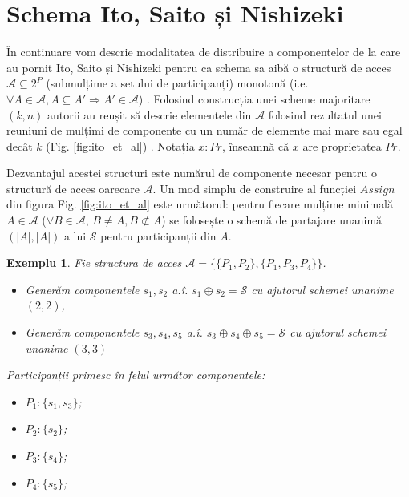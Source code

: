 \documentclass[oneside, 12pt]{book}
\newtheorem{exemplu}{\textbf{Exemplu}}[section]
\begin{document}

\section{Schema Ito, Saito și Nishizeki}
\label{Ito}

În continuare vom descrie modalitatea de distribuire a componentelor de la care au pornit Ito, Saito și Nishizeki pentru ca schema sa aibă o structură de acces $\mathcal{A} \subseteq 2^P$ (submulțime a setului de participanți) monotonă (i.e. $\forall A \in \mathcal{A}, A \subseteq A' \Rightarrow A' \in \mathcal{A}$) \cite{ITO:1989}. 
Folosind construcția unei scheme majoritare $(k, n)$ autorii au reușit să descrie elementele din $\mathcal{A}$ folosind rezultatul unei reuniuni de mulțimi de componente cu un număr de elemente mai mare sau egal decât $k$ (Fig. \ref{fig:ito_et_al}) \cite{ITO:1989}. Notația $x : Pr$, înseamnă că $x$ are proprietatea $Pr$. 

Dezvantajul acestei structuri este numărul de componente necesar pentru o structură de acces oarecare $\mathcal{A}$. Un mod simplu de construire al funcției $Assign$ din figura Fig. \ref{fig:ito_et_al} este următorul: pentru fiecare mulțime minimală $A \in \mathcal{A}$ ($\forall B \in \mathcal{A}$, $B \neq A, B \not\subset A$) se folosește o schemă de partajare unanimă $(|A|, |A|)$ a lui $\mathcal{S}$ pentru participanții din $A$.

\begin{exemplu}
	Fie structura de acces $\mathcal{A} = \{ \{P_1, P_2\},\{P_1, P_3, P_4\}\}$.
	\begin{itemize}
		\item Generăm componentele $s_1, s_2$ a.î. $s_1 \oplus s_2 = \mathcal{S}$ cu ajutorul schemei unanime $(2,2)$, 
		\item Generăm componentele $s_3, s_4, s_5$ a.î. $s_3 \oplus s_4 \oplus s_5 = \mathcal{S}$ cu ajutorul schemei unanime $(3,3)$
	\end{itemize}
	Participanții primesc în felul următor componentele:
	\begin{itemize}
		\item $P_1: \{s_1, s_3\}$;
		\item $P_2: \{s_2\}$;
		\item $P_3: \{s_4\}$;
		\item $P_4: \{s_5\}$;
	\end{itemize}
\end{exemplu}
\end{document}
